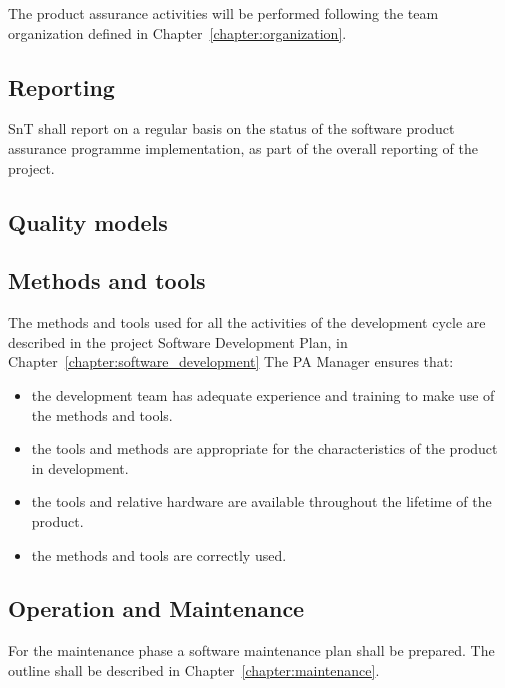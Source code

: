 The product assurance activities will be performed following the team organization defined in Chapter~\ref{chapter:organization}.



\subsection{Reporting}
SnT shall report on a regular basis on the status of the software product assurance programme implementation, as part of the overall reporting of the project.

\subsection{Quality models}

\subsection{Methods and tools}

The methods and tools used for all the activities of the development cycle are described in the project Software Development Plan, in Chapter~\ref{chapter:software_development}
The PA Manager ensures that:
\begin{itemize}
  \item the development team has adequate experience and training to make use of  the methods and tools.
  \item the tools and methods are appropriate for the characteristics of the product in development.
  \item the tools and relative hardware are available throughout the lifetime of the product.
  \item the methods and tools are correctly used.
\end{itemize}


\subsection{Operation and Maintenance}
For the maintenance phase a software maintenance plan shall be prepared.
The outline shall be described in Chapter~\ref{chapter:maintenance}.

